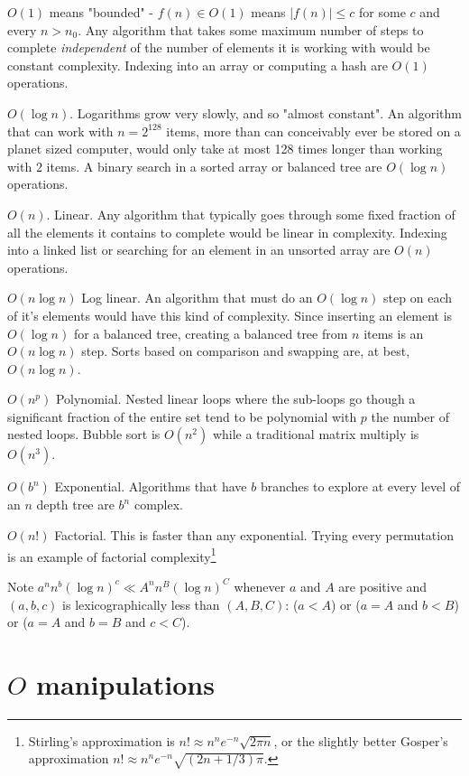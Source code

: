 \documentclass{tufte-handout}
\theoremstyle{definition}
\theoremstyle{example}
\theoremstyle{theorem}
\begin{document}
$O(1)$ means "bounded" - $f(n) \in O(1)$ means $|f(n)| \leq c$ for some $c$ and every $n > n_0$.  Any algorithm that takes some maximum number of steps to complete {\em independent} of the number of elements it is working with would be constant complexity.  Indexing into an array or computing a hash are $O(1)$ operations.

$O(\log n)$.  Logarithms grow very slowly, and so "almost constant".  An algorithm that can work with $n=2^{128}$ items, more than can conceivably ever be stored on a planet sized computer, would only take at most 128 times longer than working with $2$ items.  A binary search in a sorted array or balanced tree are $O(\log n)$ operations.

$O(n)$. Linear.  Any algorithm that typically goes through some fixed fraction of all the elements it contains to complete would be linear in complexity. Indexing into a linked list or searching for an element in an unsorted array are $O(n)$ operations.

$O(n \log n)$ Log linear.  An algorithm that must do an $O(\log n)$ step on each of it's elements would have this kind of complexity.  Since inserting an element is $O(\log n)$ for a balanced tree, creating a balanced tree from $n$ items is an $O(n \log n)$ step.  Sorts based on comparison and swapping are, at best, $O(n \log n)$.

$O(n^p)$  Polynomial.  Nested linear loops where the sub-loops go though a significant fraction of the entire set tend to be polynomial with $p$ the number of nested loops.  Bubble sort is $O(n^2)$ while a traditional matrix multiply is $O(n^3)$.  

$O(b^n)$ Exponential.  Algorithms that have $b$ branches to explore at every level of an $n$ depth tree are $b^n$ complex.

$O(n!)$ Factorial.  This is faster than any exponential.  Trying every permutation is an example of factorial complexity\footnote{Stirling's approximation is $n! \approx n^n e^{-n} \sqrt{2\pi n}$, or the slightly better Gosper's approximation $n! \approx n^n e^{-n} \sqrt{(2n+1/3)\pi}$.}

Note $a^n n^b (\log n)^c \ll A^n n^B (\log n)^C$ whenever $a$ and $A$ are positive and $(a,b,c)$ is lexicographically less than $(A,B,C)$: ($a < A$) or ($a = A$ and $b < B$) or ($a=A$ and $b=B$ and $c < C$).

\section{$O$ manipulations}
\end{document}
